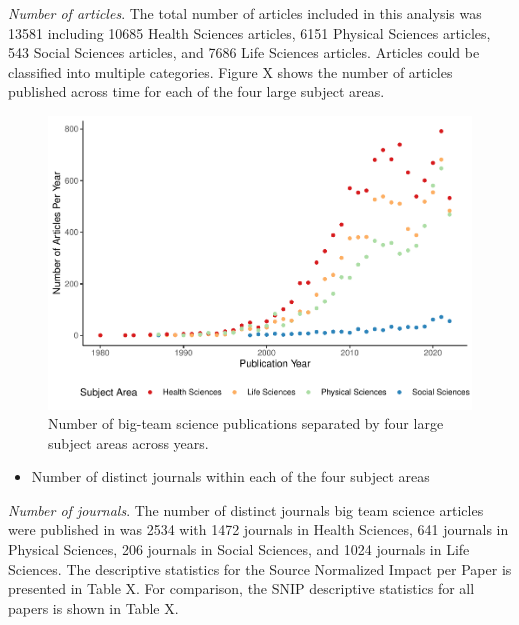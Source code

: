 \documentclass[
  man]{apa7}
\providecommand{\tightlist}{%
  \setlength{\itemsep}{0pt}\setlength{\parskip}{0pt}}
\begin{document}
\emph{Number of articles}. The total number of articles included in this analysis was 13581 including 10685 Health Sciences articles, 6151
Physical Sciences articles, 543 Social Sciences articles, and
7686 Life Sciences articles. Articles could be classified into
multiple categories. Figure X shows the number of articles published across time for each of the four large subject areas.

\begin{figure}
\centering
\includegraphics{manuscript_scopus_files/figure-latex/fig-pub-time-1.pdf}
\caption{\label{fig:fig-pub-time}Number of big-team science publications separated by four large subject areas across years.}
\end{figure}

\begin{itemize}
\tightlist
\item
  Number of distinct journals within each of the four subject areas
\end{itemize}

\emph{Number of journals}. The number of distinct journals big team science articles were published
in was 2534 with 1472 journals in Health Sciences,
641 journals in Physical Sciences, 206
journals in Social Sciences, and 1024 journals in Life
Sciences. The descriptive statistics for the Source Normalized Impact
per Paper is presented in Table X. For comparison, the SNIP descriptive
statistics for all papers is shown in Table X.
\end{document}
